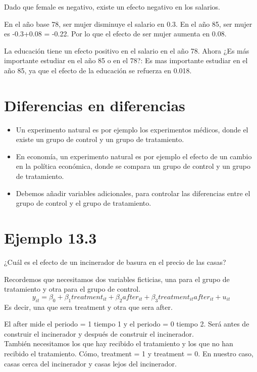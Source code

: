 Dado que female es negativo, existe un efecto negativo en los salarios. 

En el año base 78, ser mujer disminuye el salario en 0.3. En el año 85, ser mujer es -0.3+0.08 = -0.22. Por lo que el efecto de ser mujer aumenta en 0.08.

La educación tiene un efecto positivo en el salario en el año 78. Ahora ¿Es más importante estudiar en el año 85 o en el 78?: Es mas importante estudiar en el año 85, ya que el efecto de la educación se refuerza en 0.018.

\section{Diferencias en diferencias}

\begin{itemize}
    \item Un experimento natural es por ejemplo los experimentos médicos, donde el existe un grupo de control y un grupo de tratamiento.
    \item En economía, un experimento natural es por ejemplo el efecto de un cambio en la política económica, donde se compara un grupo de control y un grupo de tratamiento.
    \item Debemos añadir variables adicionales, para controlar las diferencias entre el grupo de control y el grupo de tratamiento.
\end{itemize}

\section{Ejemplo 13.3}

\begin{center}
	¿Cuál es el efecto de un incinerador de basura en el precio de las casas?
\end{center}

Recordemos que necesitamos dos variables ficticias, una para el grupo de tratamiento y otra para el grupo de control.
$$y_{it} = \beta_0 + \beta_1 treatment_{it} + \beta_2 after_{it} + \beta_3 treatment_{it} after_{it} + u_{it}$$
Es decir, una que sera treatment y otra que sera after.

El after mide el periodo = 1 tiempo 1 y el periodo = 0 tiempo 2. Será antes de construir el incinerador y después de construir el incinerador.\\

También necesitamos los que hay recibido el tratamiento y los que no han recibido el tratamiento. Cómo, treatment = 1 y treatment = 0. En nuestro caso, casas cerca del incinerador y casas lejos del incinerador.\\

